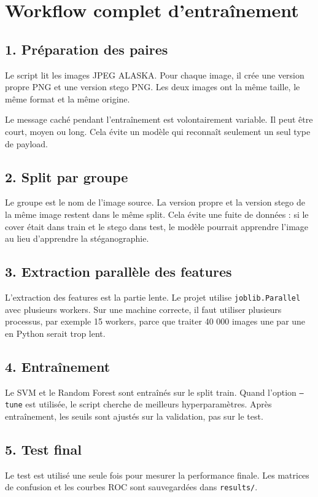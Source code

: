 \documentclass[11pt,a4paper]{article}
\begin{document}
\section{Workflow complet d'entraînement}
\subsection{1. Préparation des paires}
Le script lit les images JPEG ALASKA. Pour chaque image, il crée une version propre PNG et une version stego PNG. Les deux images ont la même taille, le même format et la même origine.

Le message caché pendant l'entraînement est volontairement variable. Il peut être court, moyen ou long. Cela évite un modèle qui reconnaît seulement un seul type de payload.

\subsection{2. Split par groupe}
Le groupe est le nom de l'image source. La version propre et la version stego de la même image restent dans le même split. Cela évite une fuite de données : si le cover était dans train et le stego dans test, le modèle pourrait apprendre l'image au lieu d'apprendre la stéganographie.

\subsection{3. Extraction parallèle des features}
L'extraction des features est la partie lente. Le projet utilise \texttt{joblib.Parallel} avec plusieurs workers. Sur une machine correcte, il faut utiliser plusieurs processus, par exemple 15 workers, parce que traiter 40 000 images une par une en Python serait trop lent.

\subsection{4. Entraînement}
Le SVM et le Random Forest sont entraînés sur le split train. Quand l'option \texttt{--tune} est utilisée, le script cherche de meilleurs hyperparamètres. Après entraînement, les seuils sont ajustés sur la validation, pas sur le test.

\subsection{5. Test final}
Le test est utilisé une seule fois pour mesurer la performance finale. Les matrices de confusion et les courbes ROC sont sauvegardées dans \texttt{results/}.
\end{document}
